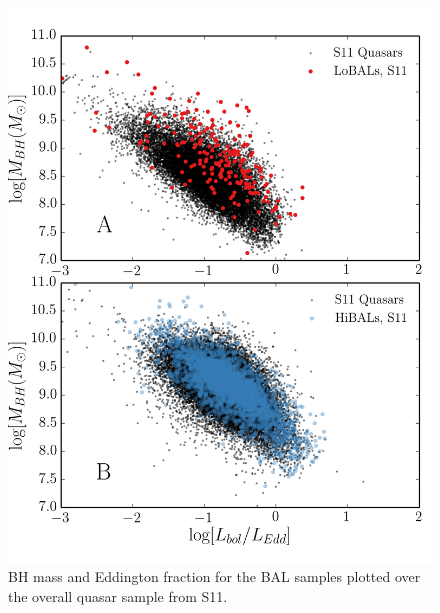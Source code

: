 \begin{figure} %
\centering
\includegraphics[width=1.0\textwidth]{figures/ewpaper/bals_2x2_scatter.png}
\caption
{
BH mass and Eddington fraction for the BAL samples plotted 
over the overall quasar sample from S11.
}
\label{fig:bal_scatter}
\end{figure} %

